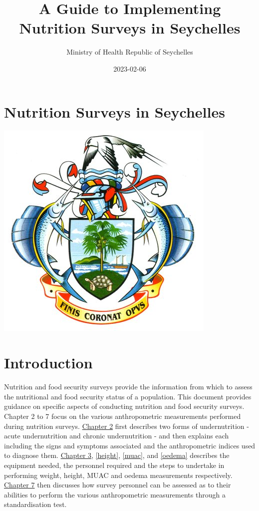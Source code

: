 \documentclass[
  12pt,
]{book}
\title{A Guide to Implementing Nutrition Surveys in Seychelles}
\author{Ministry of Health Republic of Seychelles}
\date{2023-02-06}
\begin{document}
\maketitle

{
\hypersetup{linkcolor=}
\setcounter{tocdepth}{1}
\tableofcontents
}
\hypertarget{nutrition-surveys-in-seychelles}{%
\chapter*{Nutrition Surveys in Seychelles}\label{nutrition-surveys-in-seychelles}}

\includegraphics{images/sc_moh.jpg}

\hypertarget{introduction}{%
\chapter{Introduction}\label{introduction}}

Nutrition and food security surveys provide the information from which to assess the nutritional and food security status of a population. This document provides guidance on specific aspects of conducting nutrition and food security surveys. Chapter 2 to 7 focus on the various anthropometric measurements performed during nutrition surveys. \protect\hyperlink{anthro}{Chapter 2} first describes two forms of undernutrition - acute undernutrition and chronic undernutrition - and then explains each including the signs and symptoms associated and the anthropometric indices used to diagnose them. \protect\hyperlink{weight}{Chapter 3}, \ref{height}, \ref{muac}, and \ref{oedema} describes the equipment needed, the personnel required and the steps to undertake in performing weight, height, MUAC and oedema measurements respectively. \protect\hyperlink{standard}{Chapter 7} then discusses how survey personnel can be assessed as to their abilities to perform the various anthropometric measurements through a standardisation test.
\end{document}
